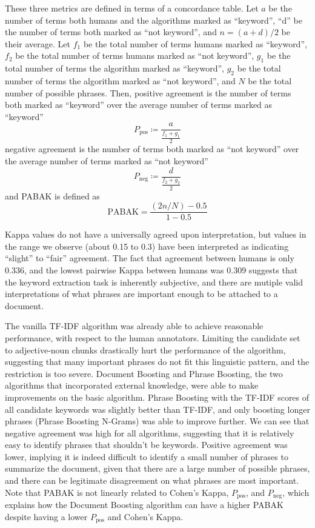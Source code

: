 These three metrics are defined in terms of a concordance table. Let $a$ be the number of terms both humans and the algorithms marked as ``keyword'', ``d'' be the number of terms both marked as ``not keyword'', and $n = (a + d) / 2$ be their average. Let $f_1$ be the total number of terms humans marked as ``keyword'', $f_2$ be the total number of terms humans marked as ``not keyword'', $g_1$ be the total number of terms the algorithm marked as ``keyword'', $g_2$ be the total number of terms the algorithm marked as ``not keyword'', and $N$ be the total number of possible phrases. Then, positive agreement is the number of terms both marked as ``keyword'' over the average number of terms marked as ``keyword''
\begin{equation*}
P_{\text{pos}} \coloneqq \frac{a}{\frac{f_1 + g_1}{2}}
\end{equation*}
negative agreement is the number of terms both marked as ``not keyword'' over the average number of terms marked as ``not keyword''
\begin{equation*}
P_{\text{neg}} \coloneqq \frac{d}{\frac{f_2 + g_2}{2}}
\end{equation*}
and PABAK is defined as
\begin{equation*}
\mathrm{PABAK} = \frac{(2n / N) - 0.5}{1 - 0.5}
\end{equation*}

Kappa values do not have a universally agreed upon interpretation, but values in the range we observe (about 0.15 to 0.3) have been interpreted as indicating ``slight'' to ``fair'' agreement. The fact that agreement between humans is only 0.336, and the lowest pairwise Kappa between humans was 0.309 suggests that the keyword extraction task is inherently subjective, and there are mutiple valid interpretations of what phrases are important enough to be attached to a document.

The vanilla TF-IDF algorithm was already able to achieve reasonable performance, with respect to the human annotators. Limiting the candidate set to adjective-noun chunks drastically hurt the performance of the algorithm, suggesting that many important phrases do not fit this linguistic pattern, and the restriction is too severe. Document Boosting and Phrase Boosting, the two algorithms that incorporated external knowledge, were able to make improvements on the basic algorithm. Phrase Boosting with the TF-IDF scores of all candidate keywords was slightly better than TF-IDF, and only boosting longer phrases (Phrase Boosting N-Grams) was able to improve further. We can see that negative agreement was high for all algorithms, suggesting that it is relatively easy to identify phrases that shouldn't be keywords. Positive agreement was lower, implying it is indeed difficult to identify a small number of phrases to summarize the document, given that there are a large number of possible phrases, and there can be legitimate disagreement on what phrases are most important. Note that PABAK is not linearly related to Cohen's Kappa, $P_{\text{pos}}$, and $P_{\text{neg}}$, which explains how the Document Boosting algorithm can have a higher PABAK despite having a lower $P_{\text{pos}}$ and Cohen's Kappa.
